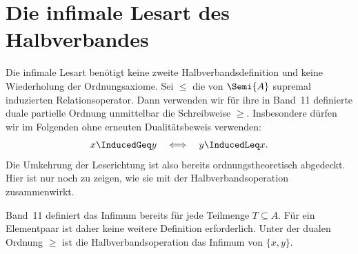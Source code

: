 \documentclass[main.tex]{subfiles}
\begin{document}
\section{Die infimale Lesart des Halbverbandes}

Die infimale Lesart benötigt keine zweite Halbverbandsdefinition und keine
Wiederholung der Ordnungsaxiome. Sei \(\leq\) die von
\(\Semi{A}\) supremal induzierten Relationsoperator. Dann verwenden wir
für ihre in Band~11 definierte duale partielle Ordnung unmittelbar die
Schreibweise \(\geq\). Insbesondere dürfen wir im Folgenden ohne erneuten
Dualitätsbeweis verwenden:
\[
  x\InducedGeq y\quad\Longleftrightarrow\quad y\InducedLeq x.
\]
Die Umkehrung der Leserichtung ist also bereits ordnungstheoretisch
abgedeckt. Hier ist nur noch zu zeigen, wie sie mit der
Halbverbandsoperation zusammenwirkt.

\begin{tabproofwide}
\end{tabproofwide}

Band~11 definiert das Infimum bereits für jede Teilmenge \(T\subseteq A\).
Für ein Elementpaar ist daher keine weitere Definition erforderlich. Unter
der dualen Ordnung \(\geq\) ist die Halbverbandsoperation das Infimum von
\(\{x,y\}\).

\begin{tabproof}
\end{tabproof}
\end{document}
